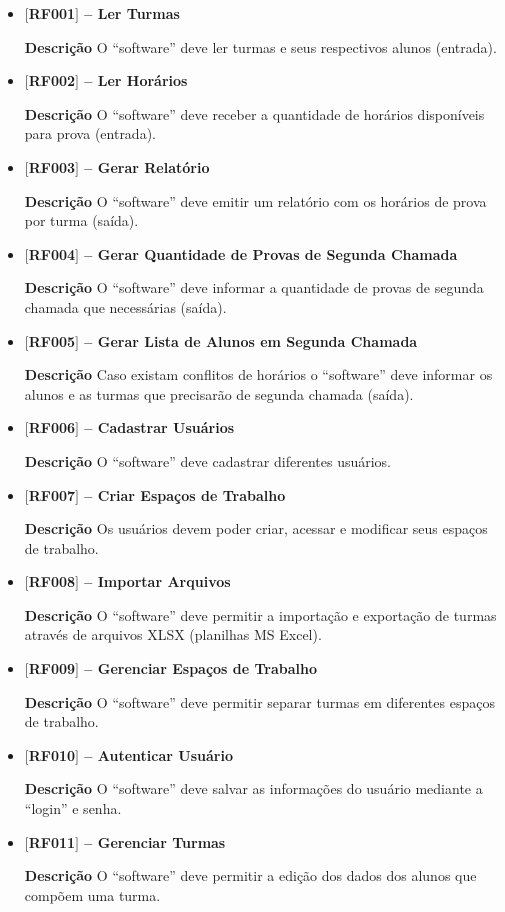 \begin{itemize}
    \item[] \textbf{$[$RF001$]$ -- Ler Turmas}

\textbf{Descrição} O “software” deve ler turmas e seus respectivos alunos (entrada).

\item[] \textbf{$[$RF002$]$ -- Ler Horários}

\textbf{Descrição} O “software” deve receber a quantidade de horários disponíveis para prova (entrada).

\item[] \textbf{$[$RF003$]$ -- Gerar Relatório}

\textbf{Descrição} O “software” deve emitir um relatório com os horários de prova por turma (saída).

\item[] \textbf{$[$RF004$]$ -- Gerar Quantidade de Provas de Segunda Chamada}

\textbf{Descrição} O “software” deve informar a quantidade de provas de segunda chamada que necessárias (saída).

\item[] \textbf{$[$RF005$]$ -- Gerar Lista de Alunos em Segunda Chamada}

\textbf{Descrição} Caso existam conflitos de horários o “software” deve informar os alunos e as turmas que precisarão de segunda chamada (saída).

\item[] \textbf{$[$RF006$]$ -- Cadastrar Usuários}

\textbf{Descrição} O “software” deve cadastrar diferentes usuários.

\item[] \textbf{$[$RF007$]$ -- Criar Espaços de Trabalho}

\textbf{Descrição} Os usuários devem poder criar, acessar e modificar seus espaços de trabalho.

\item[] \textbf{$[$RF008$]$ -- Importar Arquivos}

\textbf{Descrição} O “software” deve permitir a importação e exportação de turmas através de arquivos XLSX (planilhas MS Excel).

\item[] \textbf{$[$RF009$]$ -- Gerenciar Espaços de Trabalho}

\textbf{Descrição} O “software” deve permitir separar turmas em diferentes espaços de trabalho.

\item[] \textbf{$[$RF010$]$ -- Autenticar Usuário}

\textbf{Descrição} O “software” deve salvar as informações do usuário mediante a “login” e senha.

\item[] \textbf{$[$RF011$]$ -- Gerenciar Turmas}

\textbf{Descrição} O “software” deve permitir a edição dos dados dos alunos que compõem uma turma.
    
\end{itemize}

